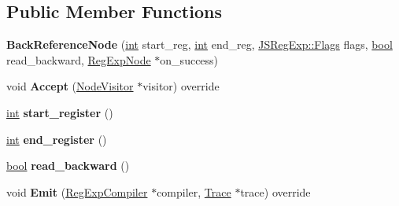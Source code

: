 \subsection*{Public Member Functions}
\begin{DoxyCompactItemize}
\item 
\mbox{\label{classv8_1_1internal_1_1BackReferenceNode_ae933efa9a953239a056c56d88fff4ed7}} 
{\bfseries Back\+Reference\+Node} (\mbox{\hyperlink{classint}{int}} start\+\_\+reg, \mbox{\hyperlink{classint}{int}} end\+\_\+reg, \mbox{\hyperlink{classv8_1_1base_1_1Flags}{J\+S\+Reg\+Exp\+::\+Flags}} flags, \mbox{\hyperlink{classbool}{bool}} read\+\_\+backward, \mbox{\hyperlink{classv8_1_1internal_1_1RegExpNode}{Reg\+Exp\+Node}} $\ast$on\+\_\+success)
\item 
\mbox{\label{classv8_1_1internal_1_1BackReferenceNode_a9d86f33912d50d93c289c02936d791f3}} 
void {\bfseries Accept} (\mbox{\hyperlink{classv8_1_1internal_1_1NodeVisitor}{Node\+Visitor}} $\ast$visitor) override
\item 
\mbox{\label{classv8_1_1internal_1_1BackReferenceNode_a5898f97fe856e743638d8a4db8aae160}} 
\mbox{\hyperlink{classint}{int}} {\bfseries start\+\_\+register} ()
\item 
\mbox{\label{classv8_1_1internal_1_1BackReferenceNode_a9cc793e4e2defe8937482aa8d3462047}} 
\mbox{\hyperlink{classint}{int}} {\bfseries end\+\_\+register} ()
\item 
\mbox{\label{classv8_1_1internal_1_1BackReferenceNode_a9f4bbaa6fe3c5ccd09d61aa0528b2b9b}} 
\mbox{\hyperlink{classbool}{bool}} {\bfseries read\+\_\+backward} ()
\item 
\mbox{\label{classv8_1_1internal_1_1BackReferenceNode_aa6684979b8c1e23af67e4cc36fb4e911}} 
void {\bfseries Emit} (\mbox{\hyperlink{classv8_1_1internal_1_1RegExpCompiler}{Reg\+Exp\+Compiler}} $\ast$compiler, \mbox{\hyperlink{classv8_1_1internal_1_1Trace}{Trace}} $\ast$trace) override
\item 
\mbox{\label{classv8_1_1internal_1_1BackReferenceNode_a68bddd7867ba77e91b7e2cd7ef8becf4}} 

\end{DoxyCompactItemize}
